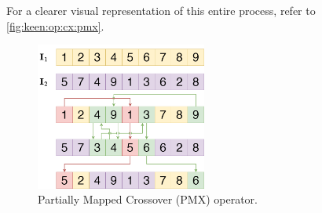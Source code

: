 
For a clearer visual representation of this entire process, refer to \vref{fig:keen:op:cx:pmx}.

\begin{figure}[ht!]
    \centering
    \includegraphics[width=0.5\textwidth]{img/keen/PMX.png}
    \caption{Partially Mapped Crossover (PMX) operator.}
    \label{fig:keen:op:cx:pmx}
\end{figure}

